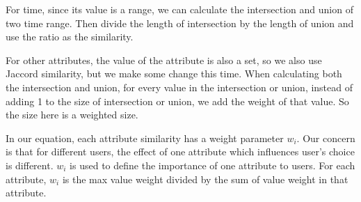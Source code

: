 For time, since its value is a range, we can calculate the intersection and union of two time
range. Then divide the length of intersection by the length of union and use the ratio as the similarity.

For other attributes, the value of the attribute is also a set, so we also use Jaccord similarity, but we make some change this
time. When calculating both the intersection and union, for every value in the intersection or union, instead of
adding 1 to the size of intersection or union, we add the weight of that value. So the size here is a weighted size.

In our equation, each attribute similarity has a weight parameter $w_i$. 
Our concern is that
for different users, the effect of one attribute which influences user's choice is different. $w_i$ is
used to define the importance of one attribute to users. For each attribute, 
$w_i$ is the max value weight divided by
the sum of value weight in that attribute.

